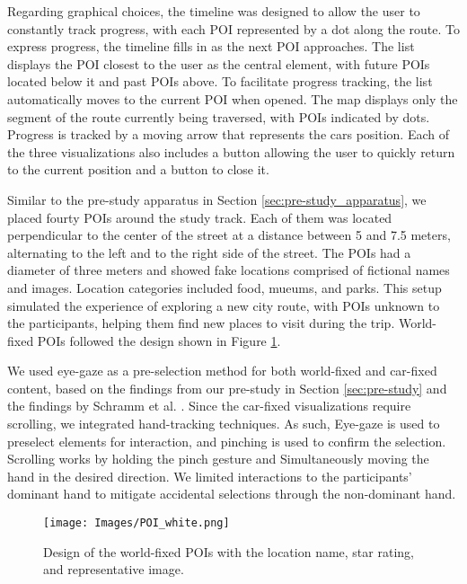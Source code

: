 Regarding graphical choices, the timeline was designed to allow the user to constantly track progress, with each POI represented by a dot along the route. To express progress, the timeline fills in as the next POI approaches. The list displays the POI closest to the user as the central element, with future POIs located below it and past POIs above. To facilitate progress tracking, the list automatically moves to the current POI when opened. The map displays only the segment of the route currently being traversed, with POIs indicated by dots. Progress is tracked by a moving arrow that represents the cars position. Each of the three visualizations also includes a button allowing the user to quickly return to the current position and a button to close it.

Similar to the pre-study apparatus in Section \ref{sec:pre-study_apparatus}, we placed fourty POIs around the study track. Each of them was located perpendicular to the center of the street at a distance between 5 and 7.5 meters, alternating to the left and to the right side of the street. The POIs had a diameter of three meters and showed fake locations comprised of fictional names and images. Location categories included food, mueums, and parks. This setup simulated the experience of exploring a new city route, with POIs unknown to the participants, helping them find new places to visit during the trip. World-fixed POIs followed the design shown in Figure  \ref{fig:study_design_POI}. 

We used eye-gaze as a pre-selection method for both world-fixed and car-fixed content, based on the findings from our pre-study in Section \ref{sec:pre-study} and the findings by Schramm et al. \cite{Schramm2023Assessing}. Since the car-fixed visualizations require scrolling, we integrated hand-tracking techniques. As such, Eye-gaze is used to preselect elements for interaction, and pinching is used to confirm the selection. Scrolling works by holding the pinch gesture and Simultaneously moving the hand in the desired direction. We limited interactions to the participants' dominant hand to mitigate accidental selections through the non-dominant hand.


\begin{figure}[ht]
    \centering
    \texttt{[image: Images/POI\_white.png]}
    \caption{Design of the world-fixed POIs with the location name, star rating, and representative image.}
    \label{fig:study_design_POI}
\end{figure}



